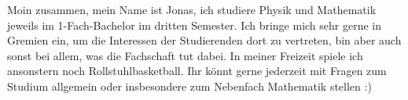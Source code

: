 \begin{multicols*}{2}
{Moin zusammen,
mein Name ist Jonas, ich studiere Physik und Mathematik jeweils im 1-Fach-Bachelor im dritten Semester.
Ich bringe mich sehr gerne in Gremien ein, um die Interessen der Studierenden dort zu vertreten, bin aber auch sonst bei allem, was die Fachschaft tut dabei.
In meiner Freizeit spiele ich ansonstern noch Rollstuhlbasketball.
Ihr könnt gerne jederzeit mit Fragen zum Studium allgemein oder insbesondere zum Nebenfach Mathematik stellen :)
\vspace{\baselineskip}}


\end{multicols*}

